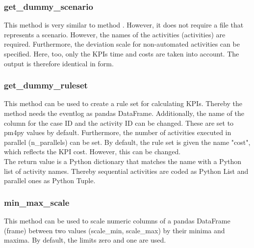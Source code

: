     \subsubsection*{get\_dummy\_scenario}
    This method is very similar to method . However, it does not require a file that represents a scenario. However, the names of the activities (activities) are required. Furthermore, the deviation scale for non-automated activities can be specified. Here, too, only the KPIs time and costs are taken into account. The output is therefore identical in form.
    \subsubsection*{get\_dummy\_ruleset}
    This method can be used to create a rule set for calculating KPIs. Thereby the method needs the eventlog as pandas DataFrame. Additionally, the name of the column for the case ID and the activity ID can be changed. These are set to pm4py values by default. Furthermore, the number of activities executed in parallel (n\_parallels) can be set. By default, the rule set is given the name "cost", which reflects the KPI cost. However, this can be changed.\\
    The return value is a Python dictionary that matches the name with a Python list of activity names. Thereby sequential activities are coded as Python List and parallel ones as Python Tuple.\label{dummyrs}
    \subsubsection*{min\_max\_scale}
    This method can be used to scale numeric columns of a pandas DataFrame (frame) between two values (scale\_min, scale\_max) by their minima and maxima. By default, the limits zero and one are used.\label{minmax}

